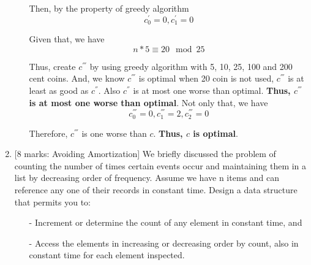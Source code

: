 \documentclass[12pt]{article}
\begin{document}
\begin{enumerate}
\begin{itemize}
Then, by the property of greedy algorithm
\begin{equation}
c_{0}^{'} = 0, c_{1}^{'} = 0
\end{equation}

Given that, we have
\begin{equation}
n * 5 \equiv 20 \mod{25}
\end{equation}

Thus, create $c^{'''}$ by using greedy algorithm with 5, 10, 25, 100 and 200 cent coins. And, we know $c^{'''}$ is optimal when 20 coin is not used, $c^{'''}$ is at least as good as $c^{''}$. Also $c^{''}$ is at most one worse than optimal. \textbf{Thus, $c^{'''}$ is at most one worse than optimal}. Not only that, we have
\begin{equation}
c_{0}^{'''} = 0, c_{1}^{'''} = 2, c_{2}^{'''} = 0
\end{equation}

Therefore, $c^{'''}$ is one worse than $c$. \textbf{Thus, $c$ is optimal}.

\end{itemize}

\medskip

\item{} [8 marks: Avoiding Amortization]
We briefly discussed the problem of counting the number of times certain events occur and maintaining them in a list by decreasing order of frequency. Assume we have n items and can reference any one of their records in constant time. Design a data structure that permits you to:
\begin{itemize}

\item[-] Increment or determine the count of any element in constant time, and

\item[-] Access the elements in increasing or decreasing order by count, also in constant time for each element inspected.

\end{itemize}



\end{enumerate}
\end{document}
